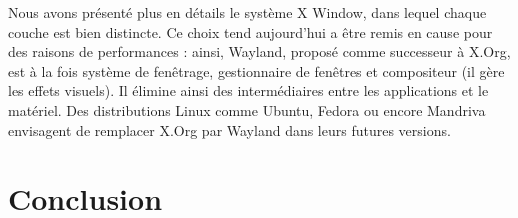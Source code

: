 \documentclass[a4paper,11pt]{report}
\begin{document}
\vspace{1em}

Nous avons présenté plus en détails le système X Window, dans lequel chaque couche est bien distincte. Ce choix tend aujourd'hui a être remis en cause pour des raisons de performances : ainsi, Wayland, proposé comme successeur à X.Org, est à la fois système de fenêtrage, gestionnaire de fenêtres et compositeur (il gère les effets visuels). Il élimine ainsi des intermédiaires entre les applications et le matériel. Des distributions Linux comme Ubuntu, Fedora ou encore Mandriva envisagent de remplacer X.Org par Wayland dans leurs futures versions.

\chapter*{Conclusion}





\end{document}
